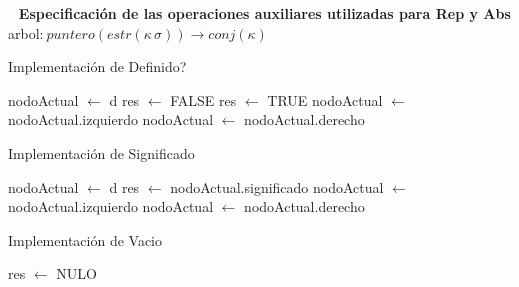 \begin{Representacion}
$\ $\newline$\ $
\newline \indent \textbf{Especificaci\'on de las operaciones auxiliares utilizadas para Rep y Abs}
\newline \indent arbol:$\ puntero(estr(\kappa\, \sigma)) \rightarrow conj(\kappa)$

\end{Representacion}

\newpage

\begin{Algoritmos}

\begin{algorithm}
\caption{Implementaci\'on de Definido?}
\begin{algorithmic}[0]
	\State nodoActual $\gets$ d
	\State res $\gets$ FALSE
			\State res $\gets$ TRUE
		\Else
				\State nodoActual $\gets$ nodoActual.izquierdo
			\Else
				\State nodoActual $\gets$ nodoActual.derecho
			\EndIf
		\EndIf
	\EndWhile
\EndFunction
\end{algorithmic}
\end{algorithm}

\begin{algorithm}
\caption{Implementaci\'on de Significado}
\begin{algorithmic}[0]
	\State nodoActual $\gets$ d
			\State res $\gets$ nodoActual.significado
		\Else
				\State nodoActual $\gets$ nodoActual.izquierdo
			\Else
				\State nodoActual $\gets$ nodoActual.derecho
			\EndIf
		\EndIf
	\EndWhile
\EndFunction
\end{algorithmic}
\end{algorithm}

\begin{algorithm}
\caption{Implementaci\'on de Vacio}
\begin{algorithmic}[0]
	\State res $\gets$ NULO
\EndFunction
\end{algorithmic}
\end{algorithm}


\end{Algoritmos}
